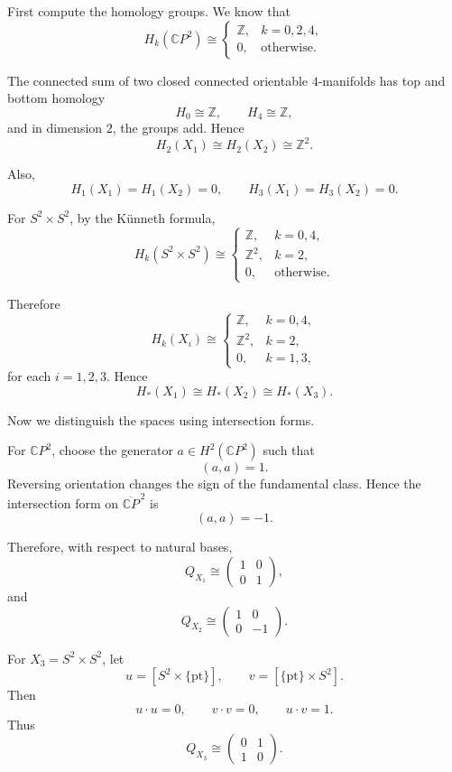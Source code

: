 \begin{solution}
First compute the homology groups. We know that
\[
H_k(\mathbb CP^2)\cong
\begin{cases}
	\mathbb Z, & k=0,2,4,\\
	0, & \text{otherwise}.
\end{cases}
\]

The connected sum of two closed connected orientable \(4\)-manifolds has top and
bottom homology
\[
H_0\cong \mathbb Z,
\qquad
H_4\cong \mathbb Z,
\]
and in dimension \(2\), the groups add. Hence
\[
H_2(X_1)\cong H_2(X_2)\cong \mathbb Z^2.
\]

Also,
\[
H_1(X_1)=H_1(X_2)=0,
\qquad
H_3(X_1)=H_3(X_2)=0.
\]

For \(S^2\times S^2\), by the Künneth formula,
\[
H_k(S^2\times S^2)\cong
\begin{cases}
	\mathbb Z, & k=0,4,\\
	\mathbb Z^2, & k=2,\\
	0, & \text{otherwise}.
\end{cases}
\]

Therefore
\[
H_k(X_i)\cong
\begin{cases}
	\mathbb Z, & k=0,4,\\
	\mathbb Z^2, & k=2,\\
	0, & k=1,3,
\end{cases}
\]
for each \(i=1,2,3\). Hence
\[
H_*(X_1)\cong H_*(X_2)\cong H_*(X_3).
\]

Now we distinguish the spaces using intersection forms.

For \(\mathbb CP^2\), choose the generator \(a\in H^2(\mathbb CP^2)\) such that
\[
(a,a)=1.
\]
Reversing orientation changes the sign of the fundamental class. Hence the
intersection form on \(\overline{\mathbb CP}^{\,2}\) is
\[
(a,a)=-1.
\]

Therefore, with respect to natural bases,
\[
Q_{X_1}\cong
\begin{pmatrix}
	1 & 0\\
	0 & 1
\end{pmatrix},
\]
and
\[
Q_{X_2}\cong
\begin{pmatrix}
	1 & 0\\
	0 & -1
\end{pmatrix}.
\]

For \(X_3=S^2\times S^2\), let
\[
u=[S^2\times \{\mathrm{pt}\}],
\qquad
v=[\{\mathrm{pt}\}\times S^2].
\]
Then
\[
u\cdot u=0,
\qquad
v\cdot v=0,
\qquad
u\cdot v=1.
\]
Thus
\[
Q_{X_3}\cong
\begin{pmatrix}
	0 & 1\\
	1 & 0
\end{pmatrix}.
\]


\end{solution}
